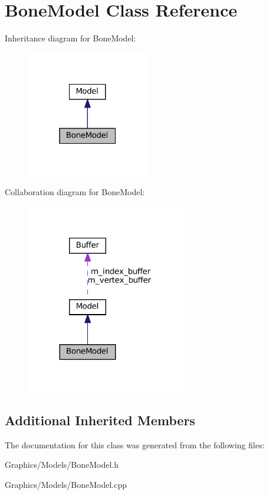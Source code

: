 \hypertarget{classBoneModel}{}\section{Bone\+Model Class Reference}
\label{classBoneModel}


Inheritance diagram for Bone\+Model\+:\nopagebreak
\begin{figure}[H]
\begin{center}
\leavevmode
\includegraphics[width=151pt]{classBoneModel__inherit__graph}
\end{center}
\end{figure}


Collaboration diagram for Bone\+Model\+:\nopagebreak
\begin{figure}[H]
\begin{center}
\leavevmode
\includegraphics[width=197pt]{classBoneModel__coll__graph}
\end{center}
\end{figure}
\subsection*{Additional Inherited Members}


The documentation for this class was generated from the following files\+:\begin{DoxyCompactItemize}
\item 
Graphics/\+Models/Bone\+Model.\+h\item 
Graphics/\+Models/Bone\+Model.\+cpp\end{DoxyCompactItemize}
